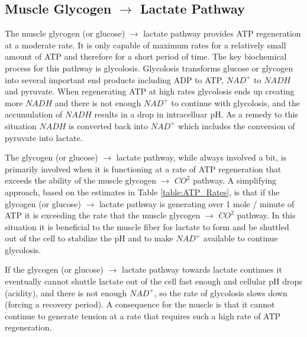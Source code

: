 \subsection{Muscle Glycogen $\rightarrow$ Lactate Pathway}

The muscle glycogen (or glucose) $\rightarrow$ lactate pathway provides ATP regeneration at a moderate rate. It is only capable of maximum rates for a relatively small amount of ATP and therefore for a short period of time. The key biochemical process for this pathway is glycolosis. 
Glycolosis transforms glucose or glycogen into several important end products including ADP to ATP, $NAD^+$ to $NADH$ and pyruvate. When regenerating ATP at high rates glycolosis ends up creating more $NADH$ and there is not enough $NAD^+$ to continue with glycolosis, and the accumulation of $NADH$ results in a drop in intracelluar pH. As a remedy to this situation $NADH$ is converted back into $NAD^+$ which includes the conversion of pyruvate into lactate.

The glycogen (or glucose) $\rightarrow$ lactate pathway, while always involved a bit, is primarily involved when it is functioning at a rate of ATP regeneration that exceeds the ability of the muscle glycogen $\rightarrow$ $CO^2$ pathway. A simplifying approach, based on the estimates in Table \ref{table:ATP_Rates}, is that if the glycogen (or glucose) $\rightarrow$ lactate pathway is generating over 1 mole / minute of ATP it is exceeding the rate that the muscle glycogen $\rightarrow$ $CO^2$ pathway. In this situation it is beneficial to the muscle fiber for lactate to form and be shuttled out of the cell to stabilize the pH and to make $NAD^+$ available to continue glycolosis. 

If the glycogen (or glucose) $\rightarrow$ lactate pathway towards lactate continues it eventually cannot shuttle lactate out of the cell fast enough and cellular pH drops (acidity), and there is not enough $NAD^+$, so the rate of glycolosis slows down (forcing a recovery period). A consequence for the muscle is that it cannot continue to generate tension at a rate that requires such a high rate of ATP regeneration.

